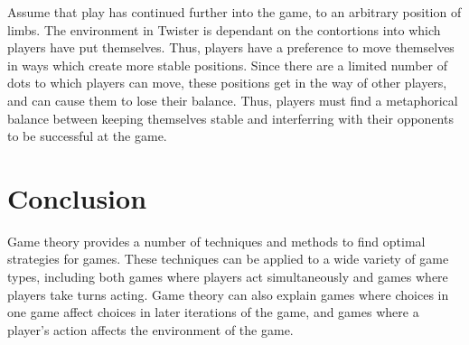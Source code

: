 Assume that play has continued further into the game, to an arbitrary position of limbs. The environment in Twister is dependant on the contortions into which players have put themselves. Thus, players have a preference to move themselves in ways which create more stable positions. Since there are a limited number of dots to which players can move, these positions get in the way of other players, and can cause them to lose their balance. Thus, players must find a metaphorical balance between keeping themselves stable and interferring with their opponents to be successful at the game.

\section{Conclusion}
Game theory provides a number of techniques and methods to find optimal strategies for games. These techniques can be applied to a wide variety of game types, including both games where players act simultaneously and games where players take turns acting. Game theory can also explain games where choices in one game affect choices in later iterations of the game, and games where a player's action affects the environment of the game.\\